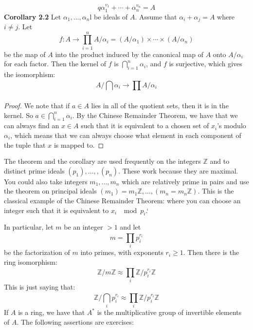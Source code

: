 \documentclass{report}
\begin{document}
    \begin{equation*}
        q\alpha_{1}^{v_{1}} + \cdots + \alpha_{n}^{v_{n}} = A
    \end{equation*}
\textbf{Corollary 2.2} Let $\alpha_{1}, \ldots, \alpha_{n}$l be ideals of $A$. Assume that $\alpha_{i} + \alpha_{j} = A$ where $i \neq j$. Let
    \begin{equation*}
        f: A \rightarrow \prod_{i = 1}^{n}  A/\alpha_{i} = (A/\alpha_{1}) \times \cdots \times (A/\alpha_{n})
    \end{equation*}
be the map of $A$ into the product induced by the canonical map of $A$ onto $A/\alpha_{i}$ for each factor. Then the kernel of $f$ is $\bigcap_{i = 1}^{n} \alpha_{i}$, and $f$ is surjective, which gives the isomorphism:
    \begin{equation*}
        A/\bigcap \alpha_{i} \rightarrow \prod_{}^{} A/\alpha_{i}
    \end{equation*}
    \begin{proof}
        We note that if $a \in A$ lies in all of the quotient sets, then it is in the kernel. So $a \in \bigcap_{i = 1}^{n} \alpha_{i}$. By the Chinese Remainder Theorem, we have that we can always find an $x \in A$ such that it is equivalent to a chosen set of $x_{i}$'s modulo $\alpha_{i}$, which means that we can always choose what element in each component of the tuple that $x$ is mapped to.
    \end{proof}

The theorem and the corollary are used frequently on the integers $\mathbb{Z}$ and to distinct prime ideals $(p_{1}), \ldots,, (p_{n})$. These work because they are maximal. You could also take integers $m_{1}, \ldots, m_{n}$ which are relatively prime in pairs and use the theorem on principal ideals $(m_{1}) = m_{1}\mathbb{Z}, \ldots, (m_{n} = m_{n}\mathbb{Z})$. This is the classical example of the Chinese Remainder Theorem: where you can choose an integer such that it is equivalent to $x_{i}$ $\mod{p_{i}}$.`

In particular, let $m$ be an integer $> 1$ and let
    \begin{equation*}
        m = \prod_{i}^{} p_{i}^{r_{i}}
    \end{equation*}
be the factorization of $m$ into primes, with exponents $r_{i} \geq 1$. Then there is the ring isomorphism:
    \begin{equation*}
        \mathbb{Z}/m\mathbb{Z} \approx \prod_{i}^{} \mathbb{Z}/p_{i}^{r_{i}}\mathbb{Z}
    \end{equation*}
This is just saying that:
    \begin{equation*}
        \mathbb{Z}/\bigcap_{i}^{} p_{i}^{r_{i}} \approx \prod_{i}^{} \mathbb{Z}/p_{i}^{r_{i}}\mathbb{Z}
    \end{equation*}
If $A$ is a ring, we have that $A^{*}$ is the multiplicative group of invertible elements of $A$. The following assertions are exercises:
\end{document}
